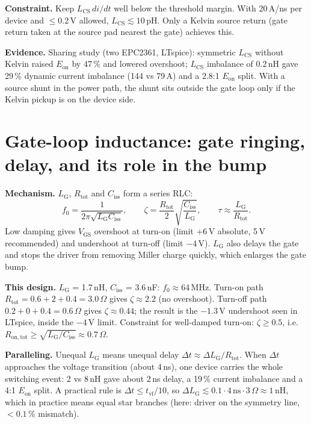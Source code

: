 ﻿\documentclass[10pt,a4paper]{article}
\begin{document}
\textbf{Constraint.} Keep $L_\mathrm{CS}\,di/dt$ well below the threshold margin. With 20\,A/ns per device and $\leq$0.2\,V allowed, $L_\mathrm{CS}\lesssim10$\,pH. Only a Kelvin source return (gate return taken at the source pad nearest the gate) achieves this.

\textbf{Evidence.} Sharing study (two EPC2361, LTspice): symmetric $L_\mathrm{CS}$ without Kelvin raised $E_\mathrm{on}$ by 47\,\% and lowered overshoot; $L_\mathrm{CS}$ imbalance of 0.2\,nH gave 29\,\% dynamic current imbalance (144 vs 79\,A) and a 2.8:1 $E_\mathrm{on}$ split. With a source shunt in the power path, the shunt sits outside the gate loop only if the Kelvin pickup is on the device side.

\section{Gate-loop inductance: gate ringing, delay, and its role in the bump}
\textbf{Mechanism.} $L_\mathrm{G}$, $R_\mathrm{tot}$ and $C_\mathrm{iss}$ form a series RLC:
\begin{equation}
f_0=\frac{1}{2\pi\sqrt{L_\mathrm{G}C_\mathrm{iss}}},\qquad \zeta=\frac{R_\mathrm{tot}}{2}\sqrt{\frac{C_\mathrm{iss}}{L_\mathrm{G}}},\qquad \tau\approx\frac{L_\mathrm{G}}{R_\mathrm{tot}}.
\end{equation}
Low damping gives $V_\mathrm{GS}$ overshoot at turn-on (limit +6\,V absolute, 5\,V recommended) and undershoot at turn-off (limit $-4$\,V). $L_\mathrm{G}$ also delays the gate and stops the driver from removing Miller charge quickly, which enlarges the gate bump.

\textbf{This design.} $L_\mathrm{G}$ = 1.7\,nH, $C_\mathrm{iss}$ = 3.6\,nF: $f_0\approx64$\,MHz.
Turn-on path $R_\mathrm{tot}=0.6+2+0.4=3.0\,\Omega$ gives $\zeta\approx2.2$ (no overshoot).
Turn-off path $0.2+0+0.4=0.6\,\Omega$ gives $\zeta\approx0.44$; the result is the $-1.3$\,V undershoot seen in LTspice, inside the $-4$\,V limit.
Constraint for well-damped turn-on: $\zeta\geq0.5$, i.e.\ $R_\mathrm{on,tot}\geq\sqrt{L_\mathrm{G}/C_\mathrm{iss}}\approx0.7\,\Omega$.

\textbf{Paralleling.} Unequal $L_\mathrm{G}$ means unequal delay $\Delta t\approx\Delta L_\mathrm{G}/R_\mathrm{tot}$. When $\Delta t$ approaches the voltage transition (about 4\,ns), one device carries the whole switching event: 2 vs 8\,nH gave about 2\,ns delay, a 19\,\% current imbalance and a 4:1 $E_\mathrm{on}$ split. A practical rule is $\Delta t\leq t_\mathrm{vf}/10$, so $\Delta L_\mathrm{G}\lesssim0.1\cdot4\,\mathrm{ns}\cdot3\,\Omega\approx1$\,nH, which in practice means equal star branches (here: driver on the symmetry line, $<0.1$\,\% mismatch).
\end{document}
